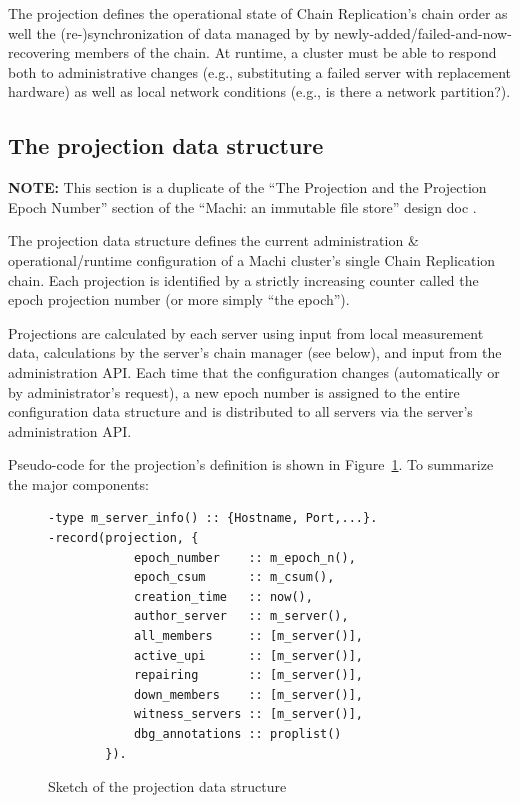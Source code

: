 \documentclass[preprint,10pt]{sigplanconf}
\begin{document}
The projection defines the operational state of Chain Replication's
chain order as well the (re-)synchronization of data managed by by
newly-added/failed-and-now-recovering members of the chain.
At runtime, a cluster must be able to respond both to
administrative changes (e.g., substituting a failed server with
replacement hardware) as well as local network conditions (e.g., is
there a network partition?).

\subsection{The projection data structure}
\label{sub:the-projection}

{\bf NOTE:} This section is a duplicate of the ``The Projection and
the Projection Epoch Number'' section of the ``Machi: an immutable
file store'' design doc \cite{machi-design}.

The projection data
structure defines the current administration \& operational/runtime
configuration of a Machi cluster's single Chain Replication chain.
Each projection is identified by a strictly increasing counter called
the epoch projection number (or more simply ``the epoch'').

Projections are calculated by each server using input from local
measurement data, calculations by the server's chain manager
(see below), and input from the administration API.
Each time that the configuration changes (automatically or by
administrator's request), a new epoch number is assigned
to the entire configuration data structure and is distributed to
all servers via the server's administration API.

Pseudo-code for the projection's definition is shown in
Figure~\ref{fig:projection}.  To summarize the major components:

\begin{figure}
\begin{verbatim}
-type m_server_info() :: {Hostname, Port,...}.
-record(projection, {
            epoch_number    :: m_epoch_n(),
            epoch_csum      :: m_csum(),
            creation_time   :: now(),
            author_server   :: m_server(),
            all_members     :: [m_server()],
            active_upi      :: [m_server()],
            repairing       :: [m_server()],
            down_members    :: [m_server()],
            witness_servers :: [m_server()],
            dbg_annotations :: proplist()
        }).
\end{verbatim}
\caption{Sketch of the projection data structure}
\label{fig:projection}
\end{figure}
\end{document}
